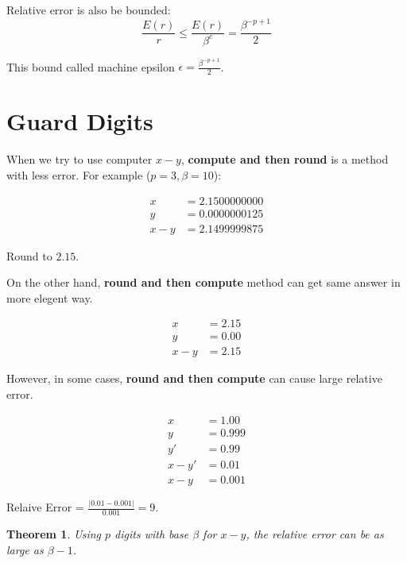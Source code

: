 \documentclass{article}
\newtheorem{theorem}{Theorem}
\begin{document}
        Relative error is also be bounded:
        \[
            \frac{E(r)}{r} \leq \frac{E(r)}{\beta^c} = \frac{\beta^{-p+1}}{2}
        \]
        
        This bound called machine epsilon $\epsilon = \frac{\beta^{-p+1}}{2}$.

        \section{Guard Digits}

        When we try to use computer $x - y$,
        \textbf{compute and then round} is a method with less error. For example ($p = 3, \beta = 10$):
        
        \begin{align}
            x     &= 2.1500000000 \nonumber \\
            y     &= 0.0000000125 \nonumber \\
            x - y &= 2.1499999875 \nonumber
        \end{align}

        Round to $2.15$.

        On the other hand, \textbf{round and then compute}
        method can get same answer in more elegent way.

        \begin{align}
            x     &= 2.15 \nonumber \\
            y     &= 0.00 \nonumber \\
            x - y &= 2.15 \nonumber
        \end{align}

        However, in some cases, \textbf{round and then compute}
        can cause large relative error.

        \begin{align}
            x      &= 1.00  \nonumber \\
            y      &= 0.999 \nonumber \\
            y'     &= 0.99  \nonumber \\
            x - y' &= 0.01  \nonumber \\
            x - y  &= 0.001 \nonumber
        \end{align}

        Relaive Error = $\frac{|0.01 - 0.001|}{0.001} = 9$.

        \begin{theorem}
            Using $p$ digits with base $\beta$ for $x-y$, the relative error
            can be as large as $\beta - 1$.
        \end{theorem}
\end{document}
